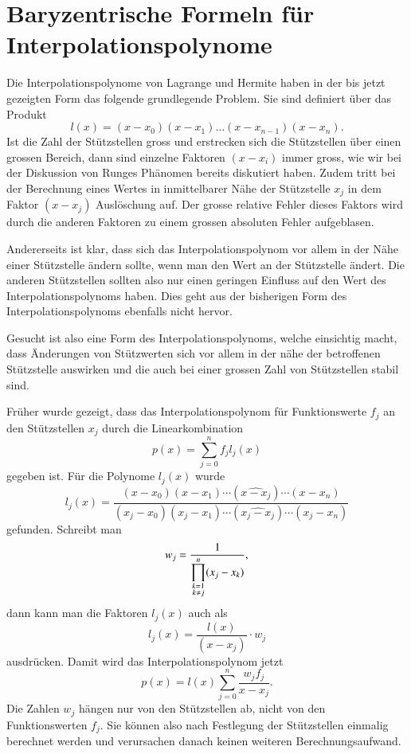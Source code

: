 %
%
%
\section{Baryzentrische Formeln für Interpolationspolynome
\label{buch:section:baryzentrisch}}
%
Die Interpolationspolynome von Lagrange und Hermite haben 
in der bis jetzt gezeigten Form das folgende grundlegende Problem.
Sie sind definiert über das Produkt
\[
l(x)
=
(x-x_0)(x-x_1)\dots (x-x_{n-1})(x-x_n).
\]
Ist die Zahl der Stützstellen gross und erstrecken sich die 
Stützstellen über einen grossen Bereich, dann sind einzelne Faktoren
$(x-x_i)$ immer gross, wie wir bei der Diskussion von Runges Phänomen
bereits diskutiert haben.
%
Zudem tritt bei der Berechnung eines Wertes in inmittelbarer 
Nähe der Stützstelle $x_j$ in dem Faktor $(x-x_j)$ Auslöschung auf.
Der grosse relative Fehler dieses Faktors wird durch die anderen Faktoren
zu einem grossen absoluten Fehler aufgeblasen.

Andererseits ist klar, dass sich das Interpolationspolynom vor allem
in der Nähe einer Stützstelle ändern sollte, wenn man den Wert an der
Stützstelle ändert.
Die anderen Stützstellen sollten also nur einen geringen Einfluss auf
den Wert des Interpolationspolynoms haben.
Dies geht aus der bisherigen Form des Interpolationspolynoms ebenfalls
nicht hervor.

Gesucht ist also eine Form des Interpolationspolynoms, welche einsichtig
macht, dass Änderungen von Stützwerten sich vor allem in der nähe der
betroffenen Stützstelle auswirken und die auch bei einer grossen Zahl
von Stützstellen stabil sind.

Früher wurde gezeigt, dass das Interpolationspolynom für Funktionswerte
$f_j$ an den Stützstellen $x_j$ durch die Linearkombination
\[
p(x) = \sum_{j=0}^n f_j l_j(x)
\]
gegeben ist.
Für die Polynome $l_j(x)$ wurde
\[
l_j(x)
=
\frac{
(x-x_0)(x-x_1)\cdots(\widehat{x-x_j}) \cdots (x-x_n)
}{
(x_j-x_0)(x_j-x_1)\cdots (\widehat{x_j-x_j})\cdots (x_j-x_n)
}
\]
gefunden.
Schreibt man
\[
w_j
=
\frac{1}{
\displaystyle\prod_{\scriptstyle k=1\atop \scriptstyle k\ne j}^n (x_j-x_k)
},
\]
dann kann man die Faktoren $l_j(x)$ auch als
\[
l_j(x)
=
\frac{l(x)}{(x-x_j)}\cdot w_j
\]
ausdrücken.
Damit wird das Interpolationspolynom jetzt
\begin{equation}
p(x)
=
l(x) \sum_{j=0}^n \frac{w_jf_j}{x-x_j}.
\label{buch:bary:px}
\end{equation}
Die Zahlen $w_j$ hängen nur von den Stützstellen ab, nicht von den
Funktionswerten $f_j$. 
Sie können also nach Festlegung der Stützstellen einmalig berechnet
werden und verursachen danach keinen weiteren Berechnungsaufwand.

